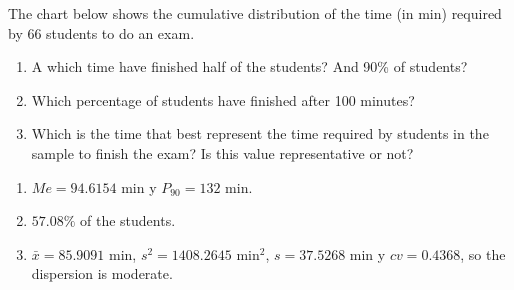 {The chart below shows the cumulative distribution of the time (in min) required by 66 students to do an exam.

\begin{center}
\resizebox{0.7\textwidth}{!}{}
\end{center}

\begin{enumerate}
\item A which time have finished half of the students? And 90\% of students?
\item Which percentage of students have finished after 100 minutes?
\item Which is the time that best represent the time required by students in the sample to finish the exam? Is this
value representative or not?
\end{enumerate}
}
{\begin{enumerate}
\item $Me = 94.6154$ min y $P_{90}=132$ min.
\item $57.08\%$ of the students.
\item $\bar x= 85.9091$ min, $s^2 =1408.2645$ min$^2$, $s= 37.5268$ min y $cv= 0.4368$, so the dispersion is moderate.
\end{enumerate}
}
